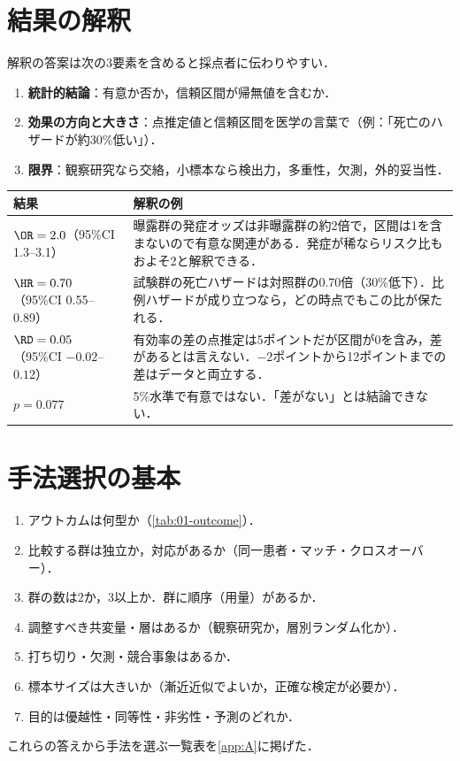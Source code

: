\section{結果の解釈}\label{sec:01-interp}
解釈の答案は次の3要素を含めると採点者に伝わりやすい．
\begin{enumerate}
\item \textbf{統計的結論}：有意か否か，信頼区間が帰無値を含むか．
\item \textbf{効果の方向と大きさ}：点推定値と信頼区間を医学の言葉で（例：「死亡のハザードが約30\%低い」）．
\item \textbf{限界}：観察研究なら交絡，小標本なら検出力，多重性，欠測，外的妥当性．
\end{enumerate}
\begin{center}\small
\begin{tabular}{@{}L{45mm}L{100mm}@{}}
\toprule
結果 & 解釈の例\\
\midrule
$\OR=2.0$（95\%CI 1.3--3.1） & 曝露群の発症オッズは非曝露群の約2倍で，区間は1を含まないので有意な関連がある．発症が稀ならリスク比もおよそ2と解釈できる．\\
$\HR=0.70$（95\%CI 0.55--0.89） & 試験群の死亡ハザードは対照群の0.70倍（30\%低下）．比例ハザードが成り立つなら，どの時点でもこの比が保たれる．\\
$\RD=0.05$（95\%CI $-0.02$--$0.12$） & 有効率の差の点推定は5ポイントだが区間が0を含み，差があるとは言えない．$-2$ポイントから12ポイントまでの差はデータと両立する．\\
$p=0.077$ & 5\%水準で有意ではない．「差がない」とは結論できない．\\
\bottomrule
\end{tabular}
\end{center}

\section{手法選択の基本}\label{sec:01-choice}
\begin{pointbox}[手法選択の質問リスト]
\begin{enumerate}
\item アウトカムは何型か（\cref{tab:01-outcome}）．
\item 比較する群は独立か，対応があるか（同一患者・マッチ・クロスオーバー）．
\item 群の数は2か，3以上か．群に順序（用量）があるか．
\item 調整すべき共変量・層はあるか（観察研究か，層別ランダム化か）．
\item 打ち切り・欠測・競合事象はあるか．
\item 標本サイズは大きいか（漸近近似でよいか，正確な検定が必要か）．
\item 目的は優越性・同等性・非劣性・予測のどれか．
\end{enumerate}
\end{pointbox}
これらの答えから手法を選ぶ一覧表を\cref{app:A}に掲げた．

